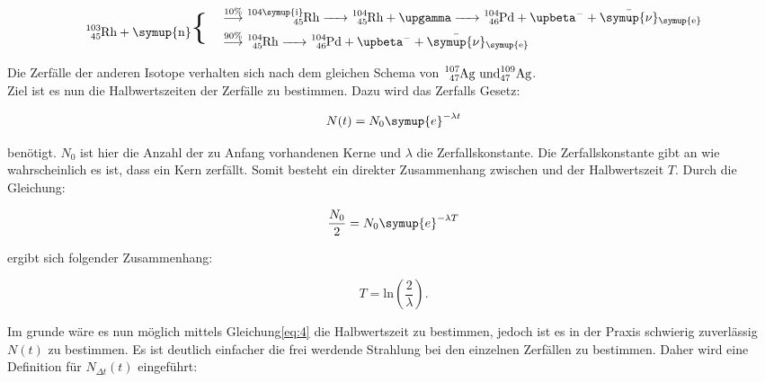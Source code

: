 \begin{equation}
   \begin{split}
      \ce{^{103}_{45}\text{Rh} + \symup{n}} \mathbin{\scalebox{2.5} \textbraceleft } \quad
   \end{split}
   \begin{split}
      &\overset{10\%}{\longrightarrow} \ce{^{104\symup{i}}_{45}\text{Rh} -> ^{104}_{45}\text{Rh} + $\upgamma$ -> ^{104}_{46}\text{Pd} + $\upbeta$^- + \bar{\symup{\nu}}_{\symup{e}} } \\
      &\overset{90\%}{\longrightarrow} \ce{^{104}_{45}\text{Rh} -> ^{104}_{46}\text{Pd} + $\upbeta$^- +\bar{\symup{\nu}}_{\symup{e}} } \\
   \end{split}
   \label{eq:Rh103}
\end{equation}

Die Zerfälle der anderen Isotope verhalten sich nach dem gleichen Schema von $\ce{^{107}_{47}\text{Ag und}^{109}_{47}\text{Ag}}$.\\
Ziel ist es nun die Halbwertszeiten der Zerfälle zu bestimmen. Dazu wird das Zerfalls Gesetz:

\begin{equation}
   N(t) = N_0 \symup{e}^{- \lambda t} 
   \label{eq:4}
\end{equation}

\noindent benötigt. $N_0$ ist hier die Anzahl der zu Anfang vorhandenen Kerne und $\lambda$ die Zerfallskonstante. Die Zerfallskonstante gibt an 
wie wahrscheinlich es ist, dass ein Kern zerfällt. Somit besteht ein direkter Zusammenhang zwischen \lambda und der Halbwertszeit $T$.
Durch die Gleichung:

\begin{equation*}
   \frac{N_0}{2} = N_0 \symup{e}^{- \lambda T} 
\end{equation*}

\noindent ergibt sich folgender Zusammenhang:

\begin{equation*}
   T = \text{ln}\left(\frac{2}{\lambda}\right) . \nonumber
\end{equation*}

\noindent Im grunde wäre es nun möglich mittels Gleichung\ref{eq:4} die Halbwertszeit zu bestimmen, jedoch ist es in der Praxis schwierig 
zuverlässig $N(t)$ zu bestimmen. Es ist deutlich einfacher die frei werdende Strahlung bei den einzelnen Zerfällen zu bestimmen.
Daher wird eine Definition für $N_{\Delta t}(t)$ eingeführt:

